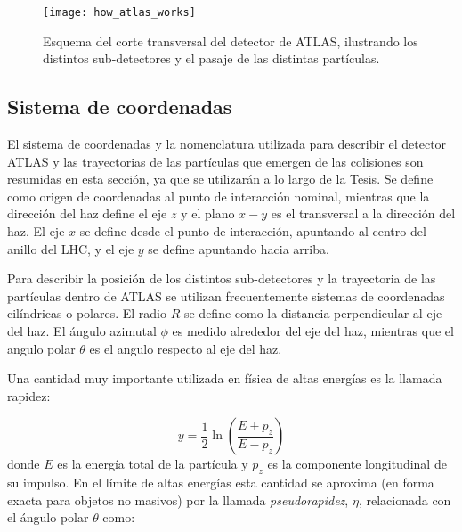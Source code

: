 \begin{figure}[!htbp]
  \centering

  \texttt{[image: how\_atlas\_works]}

  \caption{Esquema del corte transversal del detector de ATLAS, ilustrando los distintos
  sub-detectores y el pasaje de las distintas partículas.}
  \label{fig:how_atlas_works}

\end{figure}


\subsection{Sistema de coordenadas}


El sistema de coordenadas y la nomenclatura utilizada para describir el detector
ATLAS y las trayectorias de las partículas que emergen de las colisiones son
resumidas en esta sección, ya que se utilizarán a lo largo de la Tesis. Se
define como origen de coordenadas al punto de interacción nominal, mientras que
la dirección del haz define el eje $z$ y el plano $x-y$ es el transversal a la
dirección del haz. El eje $x$ se define desde el punto de interacción, apuntando
al centro del anillo del LHC, y el eje $y$ se define apuntando hacia arriba.

Para describir la posición de los distintos
sub-detectores y la trayectoria de las partículas dentro de ATLAS se utilizan
frecuentemente sistemas de coordenadas cilíndricas o polares. El radio $R$ se
define como la distancia perpendicular al eje del haz. El ángulo azimutal $\phi
$ es medido alrededor del eje del haz, mientras que el angulo polar $\theta$
es el angulo respecto al eje del haz.

Una cantidad muy importante utilizada en física de altas energías es la
llamada rapidez:

\begin{equation}
  y = \frac{1}{2} \ln \left( \frac{E+p_z}{E-p_z} \right)
\end{equation}
%
donde $E$ es la energía total de la partícula y $p_z$ es la componente
longitudinal de su impulso. En el límite de altas energías esta cantidad se
aproxima (en forma exacta para objetos no masivos) por la llamada
\emph{pseudorapidez}, $\eta$, relacionada con el ángulo polar $\theta$ como:

